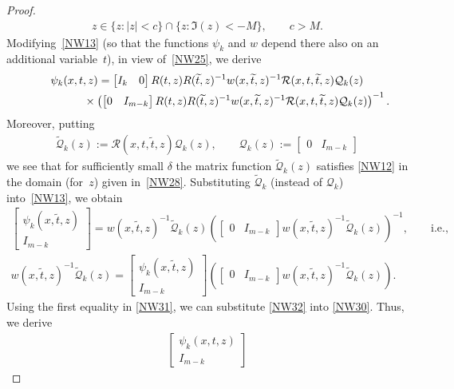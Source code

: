\documentclass[pdftex]{sigma}
\def\wt{\widetilde}
\newcommand{\cQ}{{\mathcal Q}}
\newcommand{\cR}{{\mathcal R}}
\numberwithin{equation}{section}
\begin{document}
\begin{proof}
\begin{gather}
 z \in \{z \colon |z|<c\}\cap \{z \colon \Im(z)<-M\}, \qquad\! c>M .
\end{gather}
Modifying~\eqref{NW13} (so that the functions $\psi_k$ and $w$ depend there also on an additional variable~$t$),
in view of~\eqref{NW25},
we derive
\begin{gather}\nonumber
  \psi_k (x,t,z)
= \begin{bmatrix}I_k &0 \end{bmatrix}
R(t,z)R(\wt t,z)^{-1}w(x,\wt t,z)^{-1}\cR(x,t, \wt t,z)
 \cQ_k (z)
\\
\hphantom{\psi_k (x,t,z)=}{} \times \left(
  \begin{bmatrix}0 &I_{m-k} \end{bmatrix}
 R(t,z)R(\wt t,z)^{-1}w(x,\wt t,z)^{-1}\cR(x,t, \wt t,z)
  \cQ_k(z)
 \right)^{-1}.
 \label{NW30}
\end{gather}
Moreover, putting
\begin{gather} \label{NW31}
\wt \cQ_k(z):=\cR(x,t, \wt t,z)\cQ_k(z), \qquad \cQ_k(z):=\begin{bmatrix} 0 & I_{m-k}\end{bmatrix}
\end{gather}
we see that for suf\/f\/iciently small $\delta$ the matrix function $\wt \cQ_k(z)$ satisf\/ies \eqref{NW12} in the domain (for~$z$)
given in~\eqref{NW28}. Substituting $\wt \cQ_k$ (instead of $ \cQ_k$) into~\eqref{NW13}, we obtain
\begin{gather} \nonumber
\begin{bmatrix}\psi_k(x, \wt t,z) \\ I_{m-k} \end{bmatrix}=w(x,\wt t,z)^{-1}\wt \cQ_k(z)\left(
  \begin{bmatrix}0 &I_{m-k} \end{bmatrix}
 w(x,\wt t,z)^{-1}
  \wt \cQ_k(z)
 \right)^{-1}, \qquad {\mathrm{i.e.,}}
\\ \label{NW32}
w(x,\wt t,z)^{-1}\wt \cQ_k(z)=\begin{bmatrix}\psi_k(x, \wt t,z) \\ I_{m-k} \end{bmatrix}\left(
  \begin{bmatrix}0 &I_{m-k} \end{bmatrix}
 w(x,\wt t,z)^{-1}
  \wt \cQ_k(z)
 \right).
\end{gather}
Using the f\/irst equality in \eqref{NW31}, we can substitute \eqref{NW32} into \eqref{NW30}.
Thus, we derive
\begin{gather*}
\begin{bmatrix} \psi_k(x, t,z) \\ I_{m-k} \end{bmatrix}

\end{gather*}
\end{proof}
\end{document}
